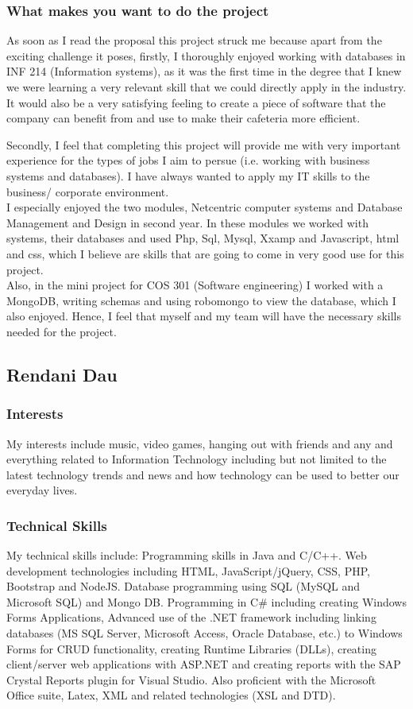 \documentclass[hidelinks, 12pt, oneside]{article}
\begin{document}
\subsubsection{What makes you want to do the project} 
As soon as I read the proposal this project struck me because apart from the exciting challenge it poses, firstly, I thoroughly enjoyed working with databases in INF 214 (Information systems), as it was the first time in the degree that I knew we were learning a very relevant skill that we could directly apply in the industry. It would also be a very satisfying feeling to create a piece of software that the company can benefit from and use to make their cafeteria more efficient.

Secondly, I feel that completing this project will provide me with very important experience for the types of jobs I aim to persue (i.e. working with business systems and databases). I have always wanted to apply my IT skills to the business/ corporate environment. 
\\
I especially enjoyed the two modules, Netcentric computer systems and Database Management and Design in second year. In these modules we worked with systems, their databases and used Php, Sql, Mysql, Xxamp and Javascript, html and css, which I believe are skills that are going to come in very good use for this project. 
\\
Also, in the mini project for COS 301 (Software engineering) I worked with a MongoDB, writing schemas and using robomongo to view the database, which I also enjoyed. Hence, I feel that myself and my team will have the necessary skills needed for the project. 
\\

\subsection{Rendani Dau}
\subsubsection{Interests}
My interests include music, video games, hanging out with friends and any and everything related to Information Technology including but not limited to the latest technology trends and news and how technology can be used to better our everyday lives.
\subsubsection{Technical Skills}
My technical skills include: Programming skills in Java and C/C++. Web development technologies including HTML, JavaScript/jQuery, CSS, PHP, Bootstrap and NodeJS. Database programming using SQL (MySQL and Microsoft SQL) and Mongo DB. Programming in C\# including creating Windows Forms Applications, Advanced use of the .NET framework including linking databases (MS SQL Server, Microsoft Access, Oracle Database, etc.) to Windows Forms for CRUD functionality, creating Runtime Libraries (DLLs), creating client/server web applications with ASP.NET and creating reports with the SAP Crystal Reports plugin for Visual Studio. Also proficient with the Microsoft Office suite, Latex, XML and related technologies (XSL and DTD).
\end{document}
